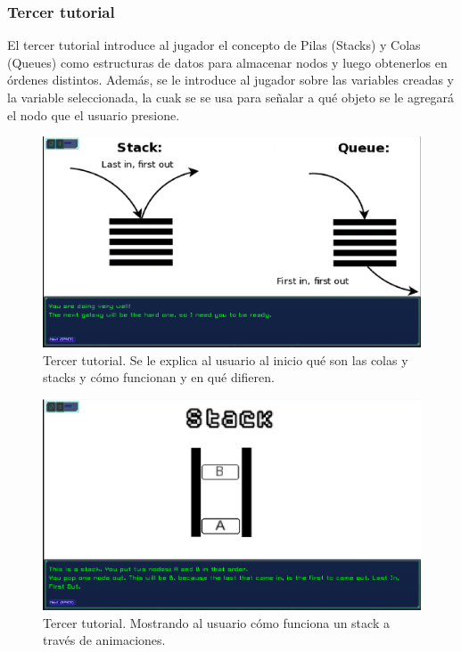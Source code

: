\subsubsection{Tercer tutorial}

El tercer tutorial introduce al jugador el concepto de Pilas (Stacks) y Colas (Queues) como estructuras de datos para almacenar nodos y luego obtenerlos en órdenes distintos. Además, se le introduce al jugador sobre las variables creadas y la variable seleccionada, la cuak se se usa para señalar a qué objeto se le agregará el nodo que el usuario presione.

\begin{figure}[h]
	\centering
	\includegraphics[scale=0.3]{imagenes/ThirdTutorialFirstDialogue.png}
	\caption{Tercer tutorial. Se le explica al usuario al inicio qué son las colas y stacks y cómo funcionan y en qué difieren.}
	\label{ThirdTutorialFirstDialogue}
\end{figure}


\begin{figure}[h]
	\centering
	\includegraphics[scale=0.3]{imagenes/ThirdTutorialStackExplanation.png}
	\caption{Tercer tutorial. Mostrando al usuario cómo funciona un stack a través de animaciones.}
	\label{ThirdTutorialStackExplanation}
\end{figure}


